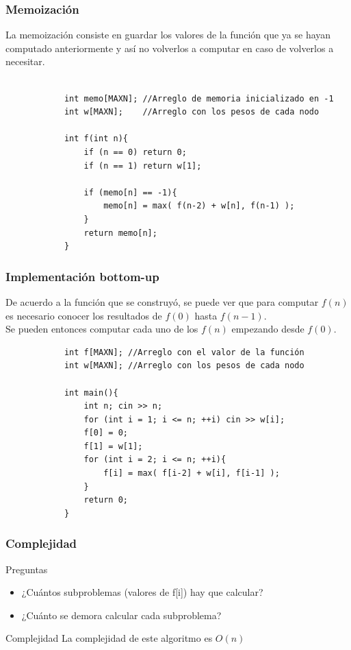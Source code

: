 \documentclass{beamer}
\begin{document}
	\begin{frame}[fragile]
		\frametitle{Memoización}
		La memoización consiste en guardar los valores de la función que ya se hayan computado anteriormente y así no volverlos a computar en caso de volverlos a necesitar.\\ \quad \\
		\begin{lstlisting}
			int memo[MAXN]; //Arreglo de memoria inicializado en -1
			int w[MAXN];    //Arreglo con los pesos de cada nodo
			
			int f(int n){
			    if (n == 0) return 0;
			    if (n == 1) return w[1];
			
			    if (memo[n] == -1){
			        memo[n] = max( f(n-2) + w[n], f(n-1) );
			    }
			    return memo[n];
			}
		\end{lstlisting}
	\end{frame}
	
	\begin{frame}[fragile]
		\frametitle{Implementación bottom-up}
		De acuerdo a la función que se construyó, se puede ver que para computar $f(n)$ es necesario conocer los resultados de $f(0)$ hasta $f(n-1)$.\\ Se pueden entonces computar cada uno de los $f(n)$ empezando desde $f(0)$. 
		\begin{lstlisting}
			int f[MAXN]; //Arreglo con el valor de la función
			int w[MAXN]; //Arreglo con los pesos de cada nodo
			
			int main(){
			    int n; cin >> n;
			    for (int i = 1; i <= n; ++i) cin >> w[i];
			    f[0] = 0;
			    f[1] = w[1];
			    for (int i = 2; i <= n; ++i){
			        f[i] = max( f[i-2] + w[i], f[i-1] );
			    }
			    return 0;
			}
		\end{lstlisting}
	\end{frame}
	
	\begin{frame}
		\frametitle{Complejidad}
		\begin{alertblock}{Preguntas}
			\begin{itemize}
				\item ¿Cuántos subproblemas (valores de f[i]) hay que calcular?
				\item ¿Cuánto se demora calcular cada subproblema?
			\end{itemize}
		\end{alertblock}	
		\pause
		\begin{block}{Complejidad}
			La complejidad de este algoritmo es $O(n)$
		\end{block}
	\end{frame}
\end{document}

